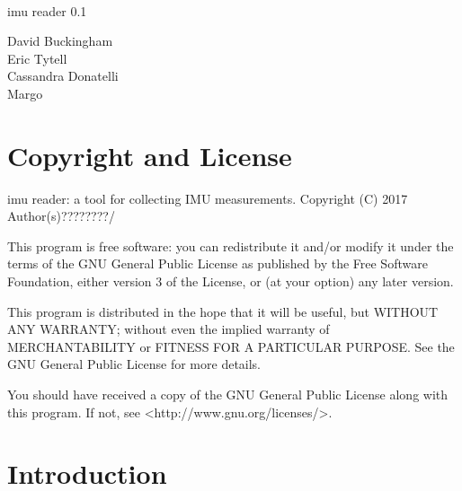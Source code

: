 \documentclass[11pt,letterpaper,article]{memoir}
\newcommand{\name}{imu reader}
\newcommand{\version}{0.1}
\begin{document}
%
%
\thispagestyle{empty}

{%
\centering
\Large

~\vspace{\fill}

{\huge 
\name{} \version
}

\vspace{2.5cm}

{\LARGE
David Buckingham \\
Eric Tytell \\
Cassandra Donatelli \\
Margo \\
}

\vspace{3.5cm}

}

\cleardoublepage

\tableofcontents*

\clearpage


\section{Copyright and License}

\name{}: a tool for collecting IMU measurements.
Copyright (C) 2017 Author(s)????????/

This program is free software: you can redistribute it and/or modify
it under the terms of the GNU General Public License as published by
the Free Software Foundation, either version 3 of the License, or
(at your option) any later version.

This program is distributed in the hope that it will be useful,
but WITHOUT ANY WARRANTY; without even the implied warranty of
MERCHANTABILITY or FITNESS FOR A PARTICULAR PURPOSE.  See the
GNU General Public License for more details.

You should have received a copy of the GNU General Public License
along with this program.  If not, see <http://www.gnu.org/licenses/>.

\section{Introduction}
\end{document}
